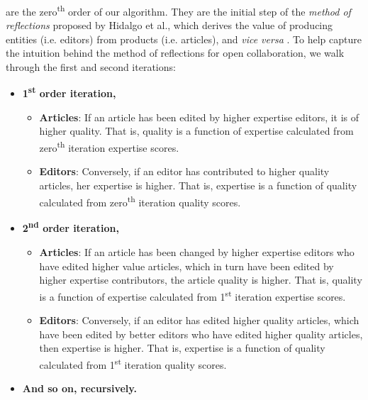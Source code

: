 are the zero\textsuperscript{th} order of our algorithm. They are the initial step of the {\it method of reflections} proposed by Hidalgo et al., which derives the value of producing entities (i.e. editors) from products (i.e. articles), and {\it vice versa} \cite{hidalgo2007,hidalgo2009}. To help capture the intuition behind the method of reflections for open collaboration, we walk through the first and second iterations:

\begin{itemize}
  \item {\bf 1\textsuperscript{st} order iteration,}  
  \begin{itemize}
  \item {\bf Articles}: If an article has been edited by higher expertise editors, it is of higher quality. That is, quality is a function of expertise calculated from zero\textsuperscript{th} iteration expertise scores.
  \item {\bf Editors}: Conversely, if an editor has contributed to higher quality articles, her expertise is higher. That is, expertise is a function of quality calculated from zero\textsuperscript{th} iteration quality scores.
  \end{itemize}
  \item {\bf 2\textsuperscript{nd} order iteration,}
    \begin{itemize}
  \item {\bf Articles}: If an article has been changed by higher expertise editors who have edited higher value articles, which in turn have been edited by higher expertise contributors, the article quality is higher. That is, quality is a function of expertise calculated from 1\textsuperscript{st} iteration expertise scores.
  \item {\bf Editors}: Conversely, if an editor has edited higher quality articles, which have been edited by better editors who have edited higher quality articles, then expertise is higher. That is, expertise is a function of quality calculated from 1\textsuperscript{st} iteration quality scores.
  \end{itemize}
 \item {\bf And so on, recursively.}\\
\end{itemize}

